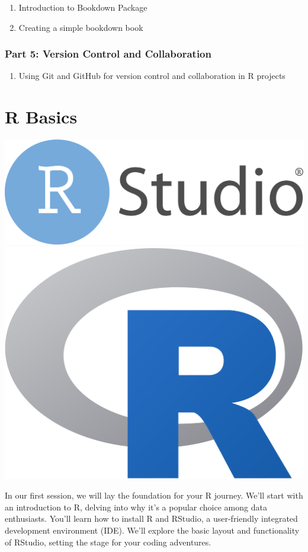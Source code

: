\documentclass[
]{book}
\providecommand{\tightlist}{%
  \setlength{\itemsep}{0pt}\setlength{\parskip}{0pt}}
\begin{document}
\begin{enumerate}
\def\labelenumi{\arabic{enumi}.}
\tightlist
\item
  Introduction to Bookdown Package
\item
  Creating a simple bookdown book
\end{enumerate}

\subsection*{Part 5: Version Control and Collaboration}\label{part-5-version-control-and-collaboration}

\begin{enumerate}
\def\labelenumi{\arabic{enumi}.}
\tightlist
\item
  Using Git and GitHub for version control and collaboration in R projects
\end{enumerate}

\chapter*{R Basics}\label{r-basics}

\includegraphics[width=0.4\linewidth,height=0.2\textheight]{images/RStudio-Logo} \includegraphics[width=0.4\linewidth,height=0.2\textheight]{images/R_logo}

In our first session, we will lay the foundation for your R journey. We'll start with an introduction to R, delving into why it's a popular choice among data enthusiasts. You'll learn how to install R and RStudio, a user-friendly integrated development environment (IDE). We'll explore the basic layout and functionality of RStudio, setting the stage for your coding adventures.
\end{document}
